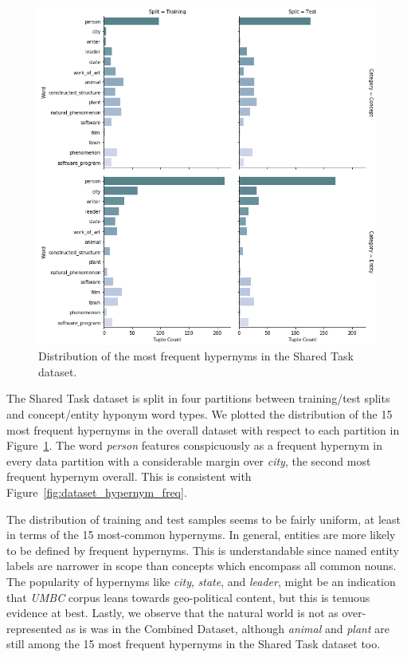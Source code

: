 \begin{figure}[ht!] 
  \centering
  \includegraphics[width=0.75\linewidth]{images/shared_task_MFH.png}
  \caption{Distribution of the most frequent hypernyms in the Shared Task dataset.}
  \label{fig:shared_task_mfh}
\end{figure}
The Shared Task dataset is split in four partitions between training/test splits and concept/entity hyponym word types.  We plotted the distribution of the 15 most frequent hypernyms in the overall dataset with respect to each partition in Figure~\ref{fig:shared_task_mfh}.  The word \textit{person} features conspicuously as a frequent hypernym in every data partition with a considerable margin over \textit{city}, the second most frequent hypernym overall.  This is consistent with Figure~\ref{fig:dataset_hypernym_freq}.

The distribution of training and test samples seems to be fairly uniform, at least in terms of the 15 most-common hypernyms.  In general, entities are more likely to be defined by frequent hypernyms.  This is understandable since named entity labels are narrower in scope than concepts which encompass all common nouns.  The popularity of hypernyms like \textit{city}, \textit{state}, and \textit{leader}, might be an  indication that \textit{UMBC} corpus leans towards geo-political content, but this is tenuous evidence at best.  Lastly, we observe that the natural world is not as over-represented as is was in the Combined Dataset, although \textit{animal} and \textit{plant} are still among the 15 most frequent hypernyms in the Shared Task dataset too.

